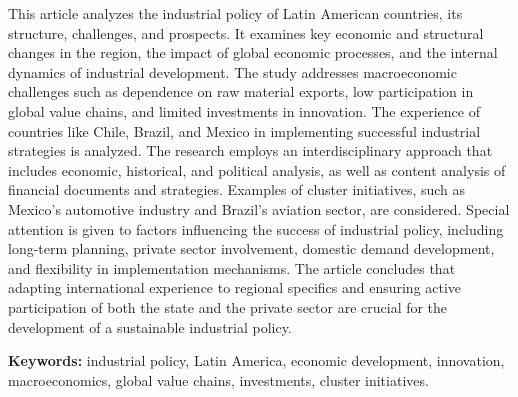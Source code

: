 This article analyzes the industrial policy of Latin American countries,
its structure, challenges, and prospects. It examines key economic and
structural changes in the region, the impact of global economic
processes, and the internal dynamics of industrial development. The
study addresses macroeconomic challenges such as dependence on raw
material exports, low participation in global value chains, and limited
investments in innovation. The experience of countries like Chile,
Brazil, and Mexico in implementing successful industrial strategies is
analyzed. The research employs an interdisciplinary approach that
includes economic, historical, and political analysis, as well as
content analysis of financial documents and strategies. Examples of
cluster initiatives, such as Mexico's automotive industry and Brazil's
aviation sector, are considered. Special attention is given to factors
influencing the success of industrial policy, including long-term
planning, private sector involvement, domestic demand development, and
flexibility in implementation mechanisms. The article concludes that
adapting international experience to regional specifics and ensuring
active participation of both the state and the private sector are
crucial for the development of a sustainable industrial policy.

{\bfseries Keywords:} industrial policy, Latin America, economic
development, innovation, macroeconomics, global value chains,
investments, cluster initiatives.

